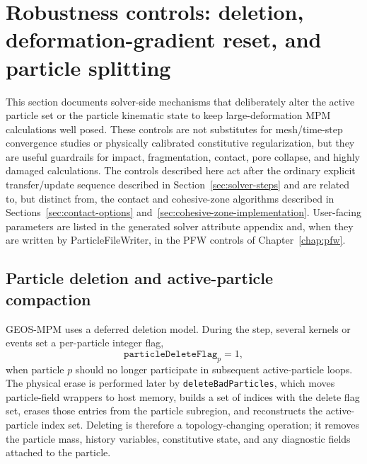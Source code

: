 \section{Robustness controls: deletion, deformation-gradient reset, and particle splitting}
\label{sec:robustness-controls}

This section documents solver-side mechanisms that deliberately alter the active particle set or the particle kinematic state to keep large-deformation MPM calculations well posed.  These controls are not substitutes for mesh/time-step convergence studies or physically calibrated constitutive regularization, but they are useful guardrails for impact, fragmentation, contact, pore collapse, and highly damaged calculations.  The controls described here act after the ordinary explicit transfer/update sequence described in Section~\ref{sec:solver-steps} and are related to, but distinct from, the contact and cohesive-zone algorithms described in Sections~\ref{sec:contact-options} and~\ref{sec:cohesive-zone-implementation}.  User-facing parameters are listed in the generated solver attribute appendix and, when they are written by ParticleFileWriter, in the PFW controls of Chapter~\ref{chap:pfw}.

\subsection{Particle deletion and active-particle compaction}
\label{subsec:robust-particle-deletion}

GEOS-MPM uses a deferred deletion model.  During the step, several kernels or events set a per-particle integer flag,
\begin{equation}
  \texttt{particleDeleteFlag}_p = 1,
\end{equation}
when particle $p$ should no longer participate in subsequent active-particle loops.  The physical erase is performed later by \texttt{deleteBadParticles}, which moves particle-field wrappers to host memory, builds a set of indices with the delete flag set, erases those entries from the particle subregion, and reconstructs the active-particle index set.  Deleting is therefore a topology-changing operation; it removes the particle mass, history variables, constitutive state, and any diagnostic fields attached to the particle.

